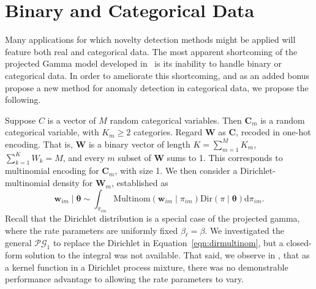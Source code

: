 \section{Binary and Categorical Data}
Many applications for which novelty detection methods might be applied will 
    feature both real and categorical data.   The most apparent 
    shortcoming of the projected Gamma model developed in~\cite{trubey:pg} is
    its inability to handle binary or categorical data.  In order to ameliorate this
    shortcoming, and as an added bonus propose a new method for anomaly detection in
    categorical data, we propose the following.

Suppose $C$ is a vector of $M$ random categorical variables.  Then $\bm{C}_{m}$ 
    is a random categorical variable, with $K_{m} \geq 2$ categories. Regard $\bm{W}$ 
    as $\bm{C}$, recoded in one-hot encoding.  That is, $\bm{W}$ is a binary vector of 
    length $K = \sum_{m = 1}^M K_{m}$, $\sum_{k = 1}^K W_k = M$, and every $m$ subset 
    of $\bm{W}$ sums to 1.  This corresponds to multinomial encoding for $\bm{C}_m$,
    with size 1. We then consider a Dirichlet-multinomial density for $\bm{W}_m$,
    established as
  \begin{equation}
    \label{eqn:dirmultinom}
    \bm{w}_{im}\mid\bm{\theta} 
    \sim 
    \int_{\pi_{im}} 
    \text{Multinom}(\bm{w}_{im}\mid\pi_{im})
    \text{Dir}(\pi\mid\bm{\theta})\text{d}\pi_{im}.
  \end{equation}
  Recall that the Dirichlet distribution is a special case of the projected gamma,
  where the rate parameters are uniformly fixed $\beta_{\ell} = \beta$.  We 
  investigated the general $\mathcal{PG}_1$ to replace the Dirichlet in 
  Equation~\ref{eqn:dirmultinom}, but a closed-form solution to the integral was 
  not available.  That said, we observe in \cite{trubey:pg}, that as a kernel 
  function in a Dirichlet process mixture, there was no demonstrable performance 
  advantage to allowing the rate parameters to vary.
 
